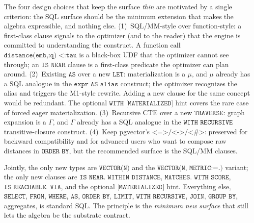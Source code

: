\documentclass[sigconf]{acmart}
\theoremstyle{plain}
\theoremstyle{definition}
\theoremstyle{remark}
\begin{document}
The four design choices that keep the surface \emph{thin} are
motivated by a single criterion: the SQL surface should be the
minimum extension that makes the algebra expressible, and
nothing else. (1)~SQL/MM-style over function-style: a first-class
clause signals to the optimizer (and to the reader) that the
engine is committed to understanding the construct. A function
call $\texttt{distance(emb,:q) <:tau}$ is a black-box UDF that
the optimizer cannot see through; an $\texttt{IS NEAR}$ clause is
a first-class predicate the optimizer can plan around. (2)~Existing
$\texttt{AS}$ over a new $\texttt{LET}$: materialization is a
$\mu$, and $\mu$ already has a SQL analogue in the
$\texttt{expr AS alias}$ construct; the optimizer recognizes the
alias and triggers the M1-style rewrite. Adding a new clause for
the same concept would be redundant. The optional
$\texttt{WITH [MATERIALIZED]}$ hint covers the rare case of
forced eager materialization. (3)~Recursive CTE over a new
$\texttt{TRAVERSE}$: graph expansion is a $\Gamma$, and $\Gamma$
already has a SQL analogue in the $\texttt{WITH RECURSIVE}$
transitive-closure construct. (4)~Keep pgvector's
$\texttt{<=>}/\texttt{<->}/\texttt{<\#>}$: preserved for backward
compatibility and for advanced users who want to compose raw
distances in $\texttt{ORDER BY}$, but the recommended surface
is the SQL/MM clauses.

Jointly, the only new types are $\texttt{VECTOR(N)}$ and the
$\texttt{VECTOR(N, METRIC:=.)}$ variant; the only new clauses
are $\texttt{IS NEAR. WITHIN DISTANCE}$, $\texttt{MATCHES. WITH SCORE}$, $\texttt{IS REACHABLE. VIA}$, and the optional $\texttt{[MATERIALIZED]}$ hint. Everything else, $\texttt{SELECT}$, $\texttt{FROM}$, $\texttt{WHERE}$, $\texttt{AS}$, $\texttt{ORDER BY}$, $\texttt{LIMIT}$, $\texttt{WITH RECURSIVE}$, $\texttt{JOIN}$, $\texttt{GROUP BY}$, aggregates, is standard SQL. The
principle is the \emph{minimum new surface} that still lets the
algebra be the substrate contract.
\end{document}
